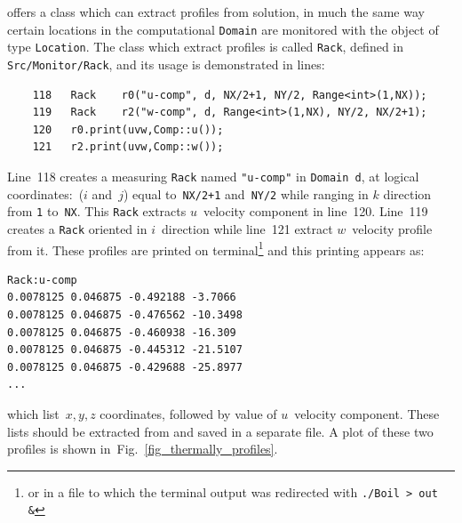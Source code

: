 {\psiboil} offers a class which can extract profiles from solution, in much the 
same way certain locations in the computational {\tt Domain} are monitored with
the object of type {\tt Location}. The class which extract profiles is called
{\tt Rack}, defined in {\tt Src/Monitor/Rack}, and its usage is demonstrated in lines:
%
{\small \begin{verbatim}
    118   Rack    r0("u-comp", d, NX/2+1, NY/2, Range<int>(1,NX));
    119   Rack    r2("w-comp", d, Range<int>(1,NX), NY/2, NX/2+1);
    120   r0.print(uvw,Comp::u());
    121   r2.print(uvw,Comp::w());
\end{verbatim}}
%
Line~118 creates a measuring {\tt Rack} named {\tt "u-comp"} in {\tt Domain d},
at logical coordinates:~($i$ and~$j$) equal to~{\tt NX/2+1} and~{\tt NY/2} while
ranging in $k$ direction from {\tt 1} to~{\tt NX}. This {\tt Rack} extracts
$u$~velocity component in line~120. 
Line~119 creates a {\tt Rack} oriented in $i$~direction while line~121 extract 
$w$~velocity profile from it. These profiles are printed on 
terminal\footnote{or in a file to which the terminal output was redirected 
with {\tt ./Boil > out \&}} and this printing appears as:
%
{\small \begin{verbatim}
Rack:u-comp
0.0078125 0.046875 -0.492188 -3.7066
0.0078125 0.046875 -0.476562 -10.3498
0.0078125 0.046875 -0.460938 -16.309
0.0078125 0.046875 -0.445312 -21.5107
0.0078125 0.046875 -0.429688 -25.8977
...
\end{verbatim}}
%
which list~$x, y, z$ coordinates, followed by value of $u$~velocity component.
These lists should be extracted from and saved in a separate file. A plot
of these two profiles is shown in~Fig.~\ref{fig_thermally_profiles}.

